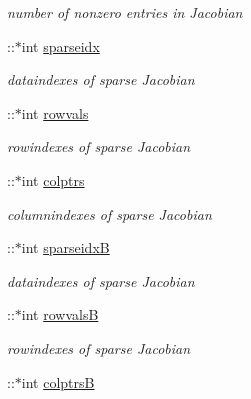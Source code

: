 \begin{DoxyCompactItemize}
\begin{DoxyCompactList}\small\item\em number of nonzero entries in Jacobian \end{DoxyCompactList}\item 
\hypertarget{classamimodel_a6ffb112eda9ff756e17104210981b30b}{}\+::$\ast$int \hyperlink{classamimodel_a6ffb112eda9ff756e17104210981b30b}{sparseidx}\label{classamimodel_a6ffb112eda9ff756e17104210981b30b}

\begin{DoxyCompactList}\small\item\em dataindexes of sparse Jacobian \end{DoxyCompactList}\item 
\hypertarget{classamimodel_aa0abea3560da3f409a28567f42d52872}{}\+::$\ast$int \hyperlink{classamimodel_aa0abea3560da3f409a28567f42d52872}{rowvals}\label{classamimodel_aa0abea3560da3f409a28567f42d52872}

\begin{DoxyCompactList}\small\item\em rowindexes of sparse Jacobian \end{DoxyCompactList}\item 
\hypertarget{classamimodel_a887e8a11654afa197d040d8bb10cbb38}{}\+::$\ast$int \hyperlink{classamimodel_a887e8a11654afa197d040d8bb10cbb38}{colptrs}\label{classamimodel_a887e8a11654afa197d040d8bb10cbb38}

\begin{DoxyCompactList}\small\item\em columnindexes of sparse Jacobian \end{DoxyCompactList}\item 
\hypertarget{classamimodel_adcfae93a688a66f1954d0832f51e4cc0}{}\+::$\ast$int \hyperlink{classamimodel_adcfae93a688a66f1954d0832f51e4cc0}{sparseidx\+B}\label{classamimodel_adcfae93a688a66f1954d0832f51e4cc0}

\begin{DoxyCompactList}\small\item\em dataindexes of sparse Jacobian \end{DoxyCompactList}\item 
\hypertarget{classamimodel_a1ba81ee0e28fe7c7576911973c82be70}{}\+::$\ast$int \hyperlink{classamimodel_a1ba81ee0e28fe7c7576911973c82be70}{rowvals\+B}\label{classamimodel_a1ba81ee0e28fe7c7576911973c82be70}

\begin{DoxyCompactList}\small\item\em rowindexes of sparse Jacobian \end{DoxyCompactList}\item 
\hypertarget{classamimodel_a3a4891c5565b544dd7d4362dbbfaadf7}{}\+::$\ast$int \hyperlink{classamimodel_a3a4891c5565b544dd7d4362dbbfaadf7}{colptrs\+B}\label{classamimodel_a3a4891c5565b544dd7d4362dbbfaadf7}


\end{DoxyCompactItemize}
